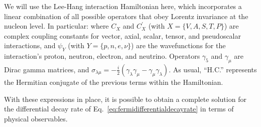 

We will use the Lee-Hang interaction Hamiltonian here, which incorporates a linear combination of all possible operators that obey Lorentz invariance at the nucleon level.  In particular\cite{LeeYang}:
\unskip
where $C_X$ and $C_X^{\prime}$ (with $X=\{V,A,S,T,P\}$) are complex coupling constants for vector, axial, scalar, tensor, and pseudoscalar interactions, and $\psi_Y$ (with $Y=\{p,n,e,\nu\}$) are the wavefunctions for the interaction's proton, neutron, electron, and neutrino.  Operators $\gamma_5$ and $\gamma_\mu$ are Dirac gamma matrices, and $\mbox{$\sigma_{\lambda\mu} = -\frac{i}{2}(\gamma_\lambda \gamma_\mu - \gamma_\mu\gamma_\lambda )$}$.  As usual, ``H.C.'' represents the Hermitian conjugate of the previous terms within the Hamiltonian.

With these expressions in place, it is possible to obtain a complete solution for the differential decay rate of Eq.~\ref{eq:fermidifferentialdecayrate} in terms of physical observables.


